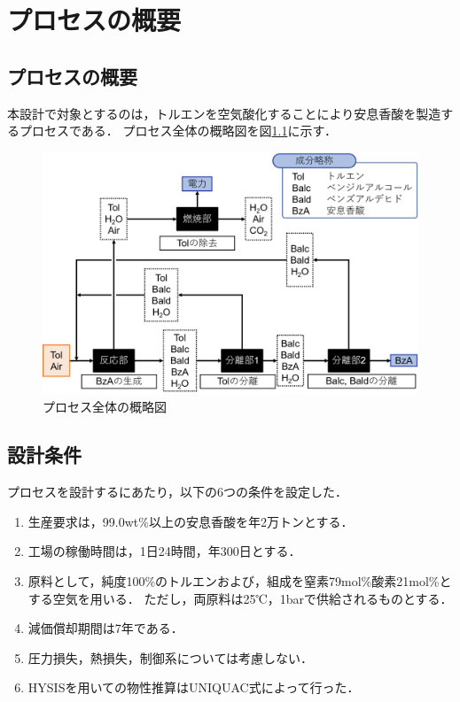 \newpage
\chapter{プロセスの概要}
\section{プロセスの概要}
本設計で対象とするのは，トルエンを空気酸化することにより安息香酸を製造するプロセスである．
プロセス全体の概略図を図\ref{プロセス全体のの概略図}に示す．
\begin{figure}[htbp]
    \label{プロセス全体のの概略図}
    \begin{center}
        \includegraphics[scale=0.5]{processOutline.png}
        \caption{プロセス全体の概略図}
    \end{center}
\end{figure}

\section{設計条件}
プロセスを設計するにあたり，以下の6つの条件を設定した．
\begin{enumerate}
    \item 生産要求は，99.0wt\%以上の安息香酸を年2万トンとする．\\
    \item 工場の稼働時間は，1日24時間，年300日とする．\\
    \item 原料として，純度100\%のトルエンおよび，組成を窒素79mol\%酸素21mol\%とする空気を用いる．
             ただし，両原料は25℃，1barで供給されるものとする．\\
    \item 減価償却期間は7年である．\\
    \item 圧力損失，熱損失，制御系については考慮しない．\\
    \item HYSISを用いての物性推算はUNIQUAC式によって行った．
\end{enumerate}

